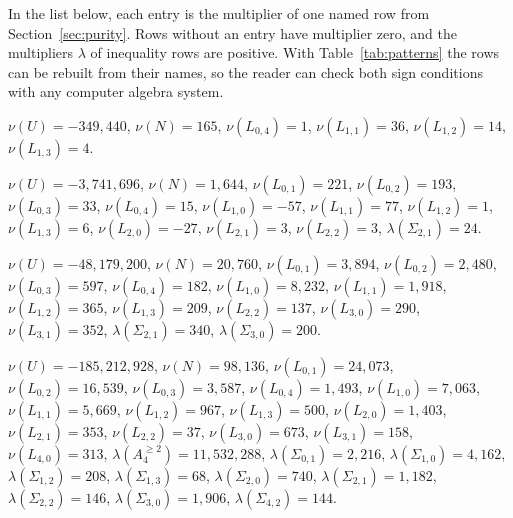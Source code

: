 \documentclass[11pt]{article}
\theoremstyle{definition}
\theoremstyle{remark}
\begin{document}
In the list below, each entry is the multiplier of one named row from
Section~\ref{sec:purity}. Rows without an entry have multiplier zero,
and the multipliers \(\lambda\) of inequality rows are positive. With
Table~\ref{tab:patterns} the rows can be rebuilt from their names, so
the reader can check both sign conditions with any computer algebra
system.
{\small\raggedright
\begin{description}[leftmargin=1.5em,style=nextline]
\item[(a), \(S\ni Z\)] \mbox{\(\nu(U)=-349{,}440\)}, \mbox{\(\nu(N)=165\)}, \mbox{\(\nu(L_{0,4})=1\)}, \mbox{\(\nu(L_{1,1})=36\)}, \mbox{\(\nu(L_{1,2})=14\)}, \mbox{\(\nu(L_{1,3})=4\)}.
\item[(a), \(S\ni ZZ\)] \mbox{\(\nu(U)=-3{,}741{,}696\)}, \mbox{\(\nu(N)=1{,}644\)}, \mbox{\(\nu(L_{0,1})=221\)}, \mbox{\(\nu(L_{0,2})=193\)}, \mbox{\(\nu(L_{0,3})=33\)}, \mbox{\(\nu(L_{0,4})=15\)}, \mbox{\(\nu(L_{1,0})=-57\)}, \mbox{\(\nu(L_{1,1})=77\)}, \mbox{\(\nu(L_{1,2})=1\)}, \mbox{\(\nu(L_{1,3})=6\)}, \mbox{\(\nu(L_{2,0})=-27\)}, \mbox{\(\nu(L_{2,1})=3\)}, \mbox{\(\nu(L_{2,2})=3\)}, \mbox{\(\lambda(\Sigma_{2,1})=24\)}.
\item[(a), \(S\ni Z^3\)] \mbox{\(\nu(U)=-48{,}179{,}200\)}, \mbox{\(\nu(N)=20{,}760\)}, \mbox{\(\nu(L_{0,1})=3{,}894\)}, \mbox{\(\nu(L_{0,2})=2{,}480\)}, \mbox{\(\nu(L_{0,3})=597\)}, \mbox{\(\nu(L_{0,4})=182\)}, \mbox{\(\nu(L_{1,0})=8{,}232\)}, \mbox{\(\nu(L_{1,1})=1{,}918\)}, \mbox{\(\nu(L_{1,2})=365\)}, \mbox{\(\nu(L_{1,3})=209\)}, \mbox{\(\nu(L_{2,2})=137\)}, \mbox{\(\nu(L_{3,0})=290\)}, \mbox{\(\nu(L_{3,1})=352\)}, \mbox{\(\lambda(\Sigma_{2,1})=340\)}, \mbox{\(\lambda(\Sigma_{3,0})=200\)}.
\item[(b), \(S\ni Z^4\), \(A_4\geq2\)] \mbox{\(\nu(U)=-185{,}212{,}928\)}, \mbox{\(\nu(N)=98{,}136\)}, \mbox{\(\nu(L_{0,1})=24{,}073\)}, \mbox{\(\nu(L_{0,2})=16{,}539\)}, \mbox{\(\nu(L_{0,3})=3{,}587\)}, \mbox{\(\nu(L_{0,4})=1{,}493\)}, \mbox{\(\nu(L_{1,0})=7{,}063\)}, \mbox{\(\nu(L_{1,1})=5{,}669\)}, \mbox{\(\nu(L_{1,2})=967\)}, \mbox{\(\nu(L_{1,3})=500\)}, \mbox{\(\nu(L_{2,0})=1{,}403\)}, \mbox{\(\nu(L_{2,1})=353\)}, \mbox{\(\nu(L_{2,2})=37\)}, \mbox{\(\nu(L_{3,0})=673\)}, \mbox{\(\nu(L_{3,1})=158\)}, \mbox{\(\nu(L_{4,0})=313\)}, \mbox{\(\lambda(A_{4}^{\geq2})=11{,}532{,}288\)}, \mbox{\(\lambda(\Sigma_{0,1})=2{,}216\)}, \mbox{\(\lambda(\Sigma_{1,0})=4{,}162\)}, \mbox{\(\lambda(\Sigma_{1,2})=208\)}, \mbox{\(\lambda(\Sigma_{1,3})=68\)}, \mbox{\(\lambda(\Sigma_{2,0})=740\)}, \mbox{\(\lambda(\Sigma_{2,1})=1{,}182\)}, \mbox{\(\lambda(\Sigma_{2,2})=146\)}, \mbox{\(\lambda(\Sigma_{3,0})=1{,}906\)}, \mbox{\(\lambda(\Sigma_{4,2})=144\)}.

\end{description}}
\end{document}
